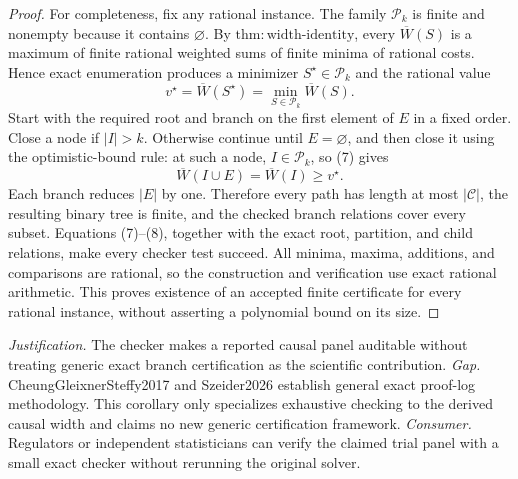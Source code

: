 \documentclass{article}
\begin{document}
\begin{proof}
For completeness, fix any rational instance.  The family
\(\mathcal P_k\) is finite and nonempty because it contains
\(\varnothing\).  By \(\mathrm{thm{:}width\text{-}identity}\), every
\(\overline W(S)\) is a maximum of finite rational weighted sums of finite
minima of rational costs.  Hence exact enumeration produces a minimizer
\(S^\star\in\mathcal P_k\) and the rational value
\[
v^\star=\overline W(S^\star)=\min_{S\in\mathcal P_k}\overline W(S).   \tag{7}
\]
Start with the required root and branch on the first element of \(E\) in a
fixed order.  Close a node if \(|I|>k\).  Otherwise continue until
\(E=\varnothing\), and then close it using the optimistic-bound rule: at
such a node, \(I\in\mathcal P_k\), so (7) gives
\[
\overline W(I\cup E)=\overline W(I)\geq v^\star.                      \tag{8}
\]
Each branch reduces \(|E|\) by one.  Therefore every path has length at
most \(|\mathcal C|\), the resulting binary tree is finite, and the checked
branch relations cover every subset.  Equations (7)--(8), together with
the exact root, partition, and child relations, make every checker test
succeed.  All minima, maxima, additions, and comparisons are rational, so
the construction and verification use exact rational arithmetic.  This
proves existence of an accepted finite certificate for every rational
instance, without asserting a polynomial bound on its size.
\end{proof}
\par\smallskip\noindent \textit{Justification.} The checker makes a reported causal panel auditable without treating generic exact branch certification as the scientific contribution. \textit{Gap.} CheungGleixnerSteffy2017 and Szeider2026 establish general exact proof-log methodology. This corollary only specializes exhaustive checking to the derived causal width and claims no new generic certification framework. \textit{Consumer.} Regulators or independent statisticians can verify the claimed trial panel with a small exact checker without rerunning the original solver.
\end{document}
